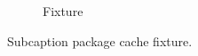 \documentclass{article}
\begin{document}
\begin{figure}
\centering
\begin{subfigure}{0.4\linewidth}
\centering\fbox{\rule{0pt}{1cm}\rule{1cm}{0pt}}
\caption{Fixture}
\end{subfigure}
\caption{Subcaption package cache fixture.}
\end{figure}
\end{document}
